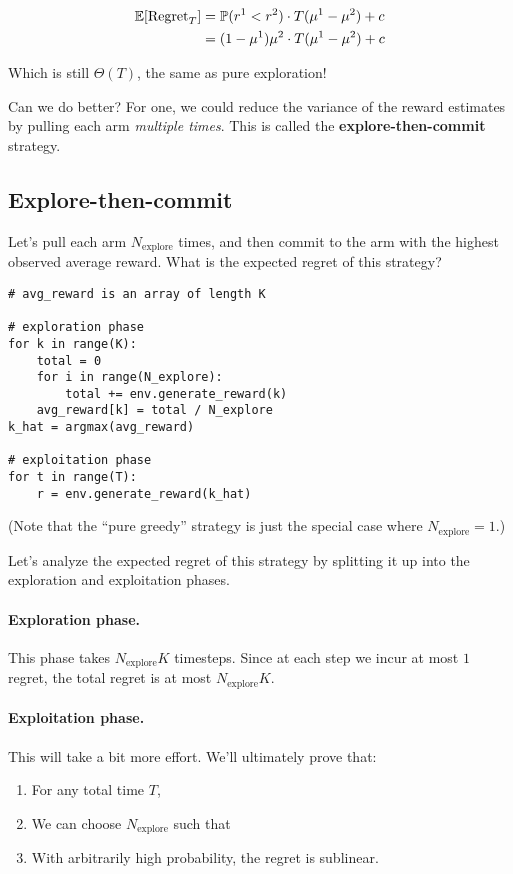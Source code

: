 \documentclass[../main/main]{subfiles}
\begin{document}
\begin{align*}
    \operatorname*{\mathbb{E}}[\text{Regret}_T] &= \operatorname{\mathbb{P}}(r^1 < r^2) \cdot T(\mu^1 - \mu^2) + c \\
    &= (1 - \mu^1) \mu^2 \cdot T(\mu^1 - \mu^2) + c
\end{align*}

Which is still $\Theta(T)$, the same as pure exploration!

Can we do better? For one, we could reduce the variance of the reward estimates by pulling each arm \emph{multiple times}. This is called the \textbf{explore-then-commit} strategy.

\subsection{Explore-then-commit}

Let's pull each arm $N_{\text{explore}}$ times, and then commit to the arm with the highest observed average reward. What is the expected regret of this strategy?

\begin{lstlisting}
# avg_reward is an array of length K

# exploration phase
for k in range(K):
    total = 0
    for i in range(N_explore):
        total += env.generate_reward(k)
    avg_reward[k] = total / N_explore
k_hat = argmax(avg_reward)

# exploitation phase
for t in range(T):
    r = env.generate_reward(k_hat)
\end{lstlisting}

(Note that the ``pure greedy'' strategy is just the special case where $N_{\text{explore}} = 1$.)

Let's analyze the expected regret of this strategy by splitting it up into the exploration and exploitation phases.

\paragraph*{Exploration phase.} This phase takes $N_{\text{explore}} K$ timesteps. Since at each step we incur at most $1$ regret, the total regret is at most $N_{\text{explore}} K$.

\paragraph*{Exploitation phase.} This will take a bit more effort. We'll ultimately prove that:

\begin{enumerate}
    \item For any total time $T$,
    \item We can choose $N_{\text{explore}}$ such that
    \item With arbitrarily high probability, the regret is sublinear.
\end{enumerate}
\end{document}
